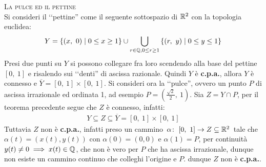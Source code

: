 \begin{example}\textsc{La pulce ed il pettine}\\
	Si consideri il ‘‘pettine'' come il seguente sottospazio di $\mathbb{R} ^2$ con la topologia euclidea:
		\begin{equation*}
			Y= \left\{ (x,\ 0) \mid 0\leq x\geq 1 \right\} \cup \mathop{{\bigcup}}\displaylimits_{r\in\mathbb{Q}, 0\leq r\geq 1} \left\{ (r,\ y) \mid 0\leq y \leq 1 \right\}
		\end{equation*}
	Presi due punti su $Y$ si possono collegare fra loro scendendo alla base del pettine $\left[0,\ 1\right]$ e risalendo sui ‘‘denti'' di ascissa razionale. Quindi $Y$ è \textbf{c.p.a.}, allora $Y$ è connesso e $\overline{Y}=\left[0,\ 1\right]\times \left[0,\ 1\right]$.\newline 
	Si consideri ora la ‘‘pulce'', ovvero un punto $P$ di ascissa irrazionale ed ordinata 1, ad esempio $P=\left(\frac{\sqrt{2}}{2},\ 1\right)$. Sia $Z=Y\cap P$, per il teorema precedente segue che $Z$ è connesso, infatti:
		\begin{gather*}
			Y\subseteq Z \subseteq \overline{Y}=\left[0,\ 1\right]\times \left[0,\ 1\right]	
		\end{gather*}
	Tuttavia $Z$ non è \textbf{c.p.a.}, infatti preso un cammino $\funz \alpha {\left[0,\ 1\right]} {Z\subseteq \realset^2}$ tale che $\alpha(t)= \left( x(t), y(t)\right)$ con $\alpha (0)=(0,0)$ e $\alpha(1)=P$, per continuità $y(t)\neq 0 \implies x(t)\in\mathbb{Q}$, che non è vero per $P$ che ha ascissa irrazionale, dunque non esiste un cammino continuo che colleghi l'origine e $P$. dunque $Z$ non è \textbf{c.p.a.}.
\end{example}

